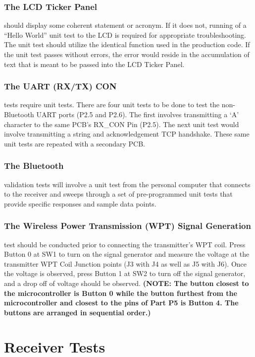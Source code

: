 \documentclass[12pt]{article}
\begin{document}
\subsubsection*{The LCD Ticker Panel} should display some coherent statement or acronym.  If it does not, running of a “Hello World” unit test to the LCD is required for appropriate troubleshooting.  The unit test should utilize the identical function used in the production code.  If the unit test passes without errors, the error would reside in the accumulation of text that is meant to be passed into the LCD Ticker Panel.

\subsubsection*{The UART (RX/TX) CON} tests require unit tests. There are four unit tests to be done to test the non-Bluetooth UART ports (P2.5 and P2.6).  The first involves transmitting a ‘A’ character to the same PCB’s RX\_CON Pin (P2.5).  The next unit test would involve transmitting a string and acknowledgement TCP handshake.  These same unit tests are repeated with a secondary PCB.

\subsubsection*{The Bluetooth} validation tests will involve a unit test from the personal computer that connects to the receiver and sweeps through a set of pre-programmed unit tests that provide specific responses and sample data points.

\subsubsection*{The Wireless Power Transmission (WPT) Signal Generation} test should be conducted prior to connecting the transmitter's WPT coil.  Press Button 0 at SW1 to turn on the signal generator and measure the voltage at the transmitter WPT Coil Junction points (J3 with J4 as well as J5 with J6).  Once the voltage is observed, press Button 1 at SW2 to turn off the signal generator, and a drop off of voltage should be observed. \textbf{(NOTE: The button closest to the microcontroller is Button 0 while the button furthest from the microcontroller and closest to the pins of Part P5 is Button 4. The buttons are arranged in sequential order.)}
\hfill
\pagebreak
\section*{Receiver Tests}  %
\end{document}

